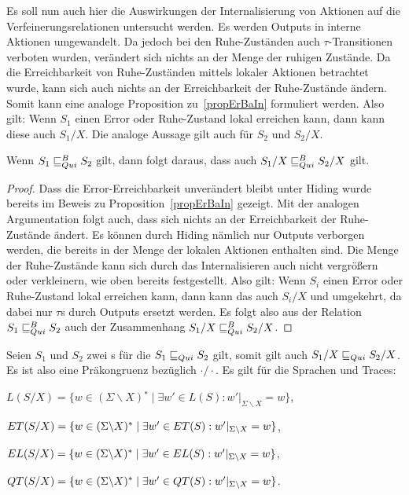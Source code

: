 Es soll nun auch hier die Auswirkungen der Internalisierung von Aktionen auf
die Verfeinerungsrelationen untersucht werden. Es werden Outputs in interne
Aktionen umgewandelt. Da jedoch bei den Ruhe-Zuständen auch
$\tau$-Transitionen verboten wurden, verändert sich nichts an der Menge der
ruhigen Zustände. Da die Erreichbarkeit von Ruhe-Zuständen mittels lokaler
Aktionen betrachtet wurde, kann sich auch nichts an der Erreichbarkeit der
Ruhe-Zustände ändern. Somit kann eine analoge Proposition zu~\ref{propErBaIn}
formuliert werden. Also gilt: Wenn $S_1$ einen Error oder Ruhe-Zustand lokal
erreichen kann, dann kann diese auch $S_1/X$. Die analoge Aussage gilt auch für
$S_2$ und $S_2/X$.

\begin{prop}
  Wenn $S_1\sqsubseteq _{Qui}^B S_2$ gilt, dann folgt daraus, dass auch $S_1/X\sqsubseteq _{Qui}^B S_2/X$
  gilt.
\end{prop}

\begin{proof}
  Dass die Error-Erreichbarkeit unverändert bleibt unter Hiding wurde bereits
  im Beweis zu Proposition~\ref{propErBaIn} gezeigt. Mit der analogen
  Argumentation folgt auch, dass sich nichts an der Erreichbarkeit der
  Ruhe-Zustände ändert. Es können durch Hiding nämlich nur Outputs verborgen
  werden, die bereits in der Menge der lokalen Aktionen enthalten sind. Die
  Menge der Ruhe-Zustände kann sich durch das Internalisieren auch nicht
  vergrößern oder verkleinern, wie oben bereits festgestellt. Also gilt: Wenn
  $S_i$ einen Error oder Ruhe-Zustand lokal erreichen kann, dann kann das auch
  $S_i/X$ und umgekehrt, da dabei nur $\tau$s durch Outputs ersetzt werden. Es
  folgt also aus der Relation $S_1 \sqsubseteq _{Qui}^B S_2$ auch der Zusammenhang $S_1/X
  \sqsubseteq _{Qui}^B S_2/X$.
\end{proof}

\begin{satz}
\label{satzPraeInterQui}
  Seien $S_1$ und $S_2$ zwei \EIO{}s für die $S_1\sqsubseteq _{Qui} S_2$ gilt, somit gilt
  auch $S_1/X\sqsubseteq _{Qui} S_2/X$. Es ist also \QRel{} eine Präkongruenz bezüglich
  $\cdot /\cdot$. Es gilt für die Sprachen und Traces:
  \begin{compactenum}[(i)]
  \item $L(S/X) = \{w\in (\Sigma\backslash X){}^*\mid \exists w'\in L(S):
      w'|_{\Sigma\backslash X} = w\}$,
    \item $ET{}(S/X) = \{w\in (\Sigma\backslash X){}^*\mid \exists
      w'\in ET{}(S): w'|_{\Sigma\backslash X} = w\}$,
    \item $EL{}(S/X) = \{w\in (\Sigma\backslash X){}^*\mid \exists w'\in
      EL(S): w'|_{\Sigma\backslash X} = w\}$,
    \item $QT{}(S/X) = \{w\in (\Sigma\backslash X){}^*\mid \exists w'\in
      QT{}(S):w'|_{\Sigma\backslash X}=w\}$.
  \end{compactenum}
\end{satz}

